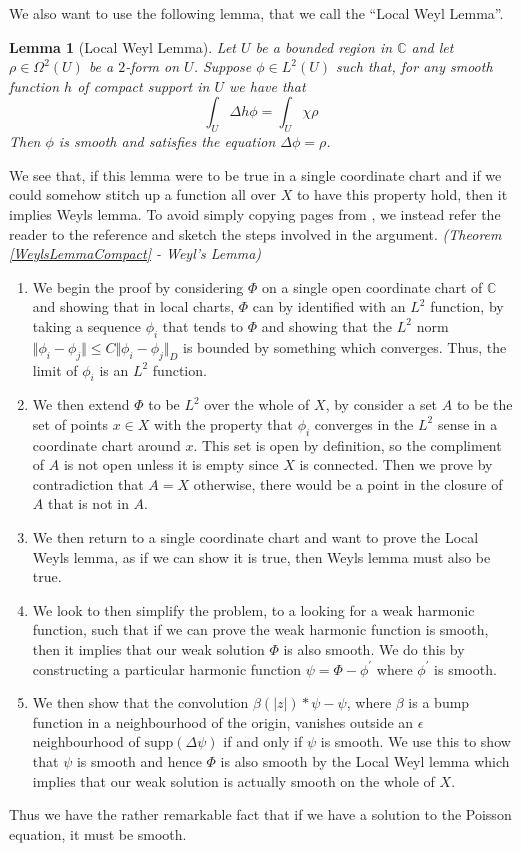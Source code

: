 \documentclass[11pt]{report}
\newtheorem{lemma}[thm]{Lemma}
\theoremstyle{definition}
\newenvironment{sproof}{%
  \renewcommand{\proofname}{Sketch Proof}\proof}{\endproof}
\begin{document}
We also want to use the following lemma, that we call the ``Local Weyl Lemma''.
\begin{lemma}[Local Weyl Lemma]\label{WeylsLemmaLocal}
  Let $U$ be a bounded region in $\mathbb{C}$ and let $\rho \in \Omega^2(U)$ be a $2$-form on $U$. Suppose $\phi \in L^2(U)$ such that, for any smooth function $h$ of compact support in $U$ we have that 
  \[\int_U \Delta h\phi = \int_U \chi\rho\]
  Then $\phi$ is smooth and satisfies the equation $\Delta \phi = \rho$.
\end{lemma}
We see that, if this lemma were to be true in a single coordinate chart and if we could somehow stitch up a function all over $X$ to have this property hold, then it implies Weyls lemma. To avoid simply copying pages from \cite[(Chapter 10)]{donaldson}, we instead refer the reader to the reference and sketch the steps involved in the argument.
\begin{sproof}\emph{(Theorem \ref{WeylsLemmaCompact} - Weyl's Lemma)}
  \hspace{1pt}
  \begin{enumerate}
    \item We begin the proof by considering $\Phi$ on a single open coordinate chart of $\mathbb{C}$ and showing that in local charts, $\Phi$ can by identified with an $L^2$ function, by taking a sequence $\phi_i$ that tends to $\Phi$ and showing that the $L^2$ norm $\Vert \phi_i - \phi_j \Vert \leq C \Vert \phi_i - \phi_j \Vert_D$ is bounded by something which converges. Thus, the limit of $\phi_i$ is an $L^2$ function.
    \item We then extend $\Phi$ to be $L^2$ over the whole of $X$, by consider a set $A$ to be the set of points $x \in X$ with the property that $\phi_i$ converges in the $L^2$ sense in a coordinate chart around $x$. This set is open by definition, so the compliment of $A$ is not open unless it is empty since $X$ is connected. Then we prove by contradiction that $A = X$ otherwise, there would be a point in the closure of $A$ that is not in $A$.
    \item We then return to a single coordinate chart and want to prove the Local Weyls lemma, as if we can show it is true, then Weyls lemma must also be true.
    \item We look to then simplify the problem, to a looking for a weak harmonic function, such that if we can prove the weak harmonic function is smooth, then it implies that our weak solution $\Phi$ is also smooth. We do this by constructing a particular harmonic function $\psi = \Phi - \phi^{\prime}$ where $\phi^{\prime}$ is smooth.
    \item We then show that the convolution $\beta(|z|)*\psi - \psi$, where $\beta$ is a bump function in a neighbourhood of the origin, vanishes outside an $\epsilon$ neighbourhood of $\text{supp}(\Delta \psi)$ if and only if $\psi$ is smooth. We use this to show that $\psi$ is smooth and hence $\Phi$ is also smooth by the Local Weyl lemma which implies that our weak solution is actually smooth on the whole of $X$.
  \end{enumerate}
  Thus we have the rather remarkable fact that if we have a solution to the Poisson equation, it must be smooth.
\end{sproof}
\end{document}
